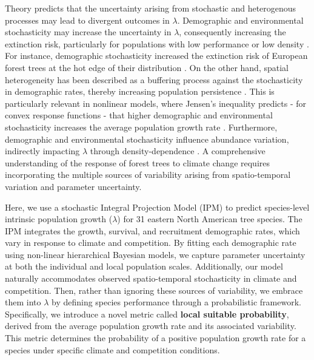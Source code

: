 Theory predicts that the uncertainty arising from stochastic and
heterogenous processes may lead to divergent outcomes in \(\lambda\).
Demographic and environmental stochasticity may increase the uncertainty
in \(\lambda\), consequently increasing the extinction risk,
particularly for populations with low performance or low density
\citep{Holt2005, Gravel2011}. For instance, demographic stochasticity
increased the extinction risk of European forest trees at the hot edge
of their distribution \citep{Guyennon2023}. On the other hand, spatial
heterogeneity has been described as a buffering process against the
stochasticity in demographic rates, thereby increasing population
persistence \citep{milles2023}. This is particularly relevant in
nonlinear models, where Jensen's inequality predicts - for convex
response functions - that higher demographic and environmental
stochasticity increases the average population growth rate
\citep{Koons2009}. Furthermore, demographic and environmental
stochasticity influence abundance variation, indirectly impacting
\(\lambda\) through density-dependence \citep{May1978, Terry2022}. A
comprehensive understanding of the response of forest trees to climate
change requires incorporating the multiple sources of variability
arising from spatio-temporal variation and parameter uncertainty.

Here, we use a stochastic Integral Projection Model (IPM) to predict
species-level intrinsic population growth (\(\lambda\)) for 31 eastern
North American tree species. The IPM integrates the growth, survival,
and recruitment demographic rates, which vary in response to climate and
competition. By fitting each demographic rate using non-linear
hierarchical Bayesian models, we capture parameter uncertainty at both
the individual and local population scales. Additionally, our model
naturally accommodates observed spatio-temporal stochasticity in climate
and competition. Then, rather than ignoring these sources of
variability, we embrace them into \(\lambda\) by defining species
performance through a probabilistic framework. Specifically, we
introduce a novel metric called \textbf{local suitable probability},
derived from the average population growth rate and its associated
variability. This metric determines the probability of a positive
population growth rate for a species under specific climate and
competition conditions.

